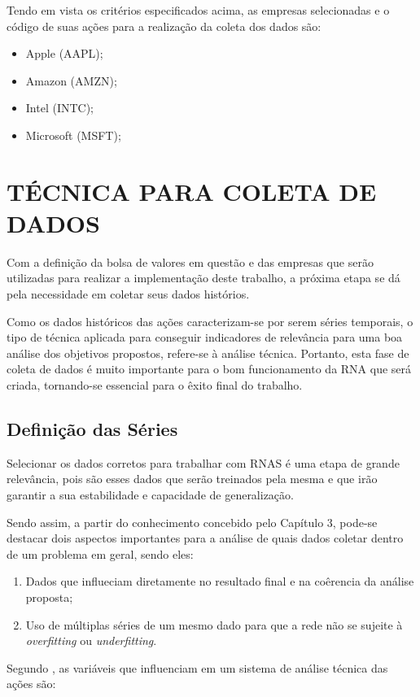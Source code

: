 Tendo em vista os critérios especificados acima, as empresas selecionadas e o código de suas ações para a realização da coleta dos dados são:
\begin{itemize}
	\item Apple (AAPL);
	\item Amazon (AMZN);
	\item Intel (INTC);
	\item Microsoft (MSFT);
\end{itemize}

\section{TÉCNICA PARA COLETA DE DADOS}
Com a definição da bolsa de valores em questão e das empresas que serão utilizadas para realizar a implementação deste trabalho, a próxima etapa se dá pela necessidade em coletar seus dados histórios.

Como os dados históricos das ações caracterizam-se por serem séries temporais, o tipo de técnica aplicada para conseguir indicadores de relevância para uma boa análise dos objetivos propostos, refere-se à análise técnica. Portanto, esta fase de coleta de dados é muito importante para o bom funcionamento da RNA que será criada, tornando-se essencial para o êxito final do trabalho.

\subsection{Definição das Séries}
Selecionar os dados corretos para trabalhar com RNAS é uma etapa de grande relevância, pois são esses dados que serão treinados pela mesma e que irão garantir a sua estabilidade e capacidade de generalização.

Sendo assim, a partir do conhecimento concebido pelo Capítulo 3, pode-se destacar dois aspectos importantes para a análise de quais dados coletar dentro de um problema em geral, sendo eles:

\begin{enumerate}
\item Dados que influeciam diretamente no resultado final e na coêrencia da análise proposta;
\item Uso de múltiplas séries de um mesmo dado para que a rede não se sujeite à \textit{overfitting} ou \textit{underfitting}.
\end{enumerate}

Segundo , as variáveis que influenciam em um sistema de análise técnica das ações são:

